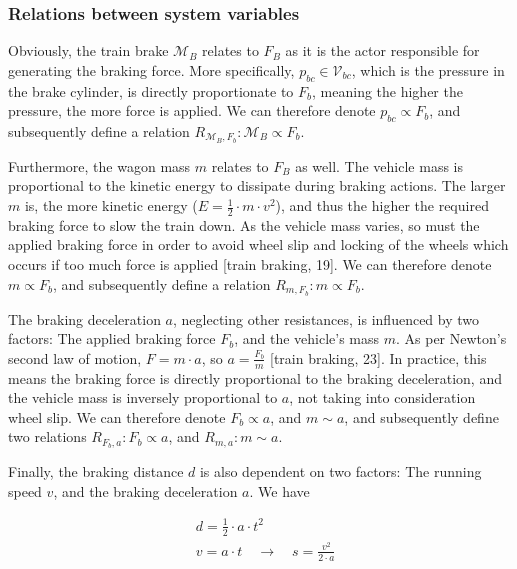 \subsubsection{Relations between system variables}
\label{sec:RelationsSystemVariables}
\par\noindent
Obviously, the train brake ${\mathcal{M}}_{B}$ relates to $F_{B}$ as it is the actor responsible for generating the braking force. More specifically, $p_{bc} \in {\mathcal{V}}_{bc}$, which is the pressure in the brake cylinder, is directly proportionate to $F_{b}$, meaning the higher the pressure, the more force is applied. We can therefore denote $p_{bc} \propto F_{b}$, and subsequently define a relation $R_{{\mathcal{M}}_{B},F_{b}}: {\mathcal{M}}_{B} \propto F_{b}$.
\par
Furthermore, the wagon mass $m$ relates to $F_{B}$ as well. The vehicle mass is proportional to the kinetic energy to dissipate during braking actions. The larger $m$ is, the more kinetic energy ($E=\frac{1}{2} \cdot m \cdot v^{2}$), and thus the higher the required braking force to slow the train down. As the vehicle mass varies, so must the applied braking force in order to avoid wheel slip and locking of the wheels which occurs if too much force is applied [train braking, 19]. We can therefore denote $m \propto F_{b}$, and subsequently define a relation $R_{m,F_{b}}: m \propto F_{b}$.
\par
The braking deceleration $a$, neglecting other resistances, is influenced by two factors: The applied braking force $F_{b}$, and the vehicle's mass $m$. As per Newton's second law of motion, $F=m \cdot a$, so $a=\frac{F_{b}}{m}$ [train braking, 23]. In practice, this means the braking force is directly proportional to the braking deceleration, and the vehicle mass is inversely proportional to $a$, not taking into consideration wheel slip. We can therefore denote $F_{b} \propto a$, and $m \sim a$, and subsequently define two relations $R_{F_{b},a}: F_{b} \propto a$, and $R_{m,a}: m \sim a$.
\par
Finally, the braking distance $d$ is also dependent on two factors: The running speed $v$, and the braking deceleration $a$.  We have 

\begin{equation}
\label{eq:brakingdistance}
\begin{aligned}
&d=\frac{1}{2} \cdot a \cdot t^{2} \\
&v=a \cdot t \quad \rightarrow \quad s=\frac{v^{2}}{2 \cdot a}
\end{aligned}
\end{equation}

